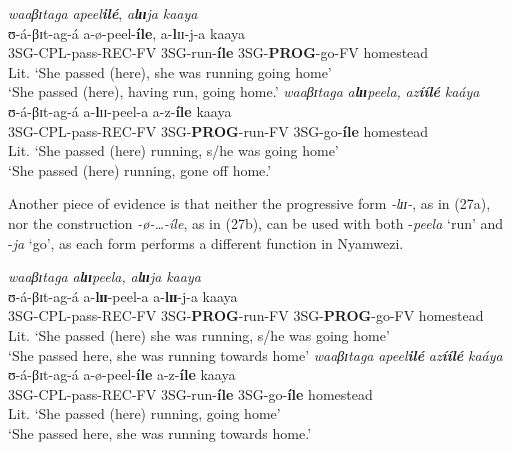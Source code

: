 \documentclass[output=paper,newtxmath,modfonts,nonflat,draftmode]{langsci/langscibook}
\begin{document}
\ea \label{ex:kanijo:26}
\ea
\glll \textit{waaβɪ}\textit{taga} \textit{apeel}\textbf{\textit{ilé}}, \textit{a}\textbf{\textit{l}}\textbf{\textit{ɪɪ}}\textit{ja} \textit{kaaya} \\
    ʊ-á-βɪt-ag-á                a-ø-peel-\textbf{íle}, a-\textbf{l}ɪɪ-j-a                 kaaya \\
    3SG-CPL-pass-REC-FV 3SG-run-\textbf{íle}  3SG-\textbf{PROG}-go-FV homestead \\
\glt    Lit. ‘She passed (here), she was running going home’ \\
   ‘She passed (here), having run, going home.’
\ex
\textit{waaβɪ}\textit{taga} \textit{a}\textbf{\textit{l}}\textbf{\textit{ɪɪ}}\textit{peela,} \textit{az}\textbf{\textit{íílé}}         \textit{kaáya}\\
    ʊ-á-βɪt-ag-á                 a-\textbf{l}ɪɪ-peel-a            a-z-\textbf{íle}       kaaya\\
    3SG-CPL-pass-REC-FV 3SG-\textbf{PROG}-run-FV 3SG-go-\textbf{íle} homestead\\
    \glt Lit. ‘She passed (here) running, s/he was going home’\\
    ‘She passed (here) running, gone off home.’
\z
\z

Another piece of evidence is that neither the progressive form \textit{-lɪɪ}\textit{-}, as in (27a), nor the construction \textit{-ø}\textit{-…-íle}, as in (27b), can be used with both -\textit{peela} ‘run’ and -\textit{ja} ‘go’, as each form performs a different function in Nyamwezi. 

\ea \label{ex:kanijo:27}
\ea
\glll *\textit{waaβɪ}\textit{taga} \textit{a}\textbf{\textit{l}}\textbf{\textit{ɪɪ}}\textit{peela,}  \textit{a}\textbf{\textit{l}}\textbf{\textit{ɪɪ}}\textit{ja} \textit{kaaya}\\
      ʊ-á-βɪt-ag-á                 a-\textbf{lɪɪ}-peel-a             a-\textbf{lɪɪ}-j-a kaaya \\
      3SG-CPL-pass-REC-FV 3SG-\textbf{PROG}-run-FV 3SG-\textbf{PROG}-go-FV  homestead \\
      \glt    Lit. ‘She passed (here) she was running, s/he was going home’\\
   ‘She passed here, she was running towards home’
\ex \glll *\textit{waaβɪ}\textit{taga} \textit{apeel}\textbf{\textit{ilé}}       \textit{az}\textbf{\textit{íílé}}        \textit{kaáya}\\
    ʊ-á-βɪt-ag-á                a-ø-peel-\textbf{íle} a-z-\textbf{íle}       kaaya\\
    3SG-CPL-pass-REC-FV 3SG-run-\textbf{íle} 3SG-go-\textbf{íle} homestead \\
\glt  Lit. ‘She passed (here) running, going home’\\
    ‘She passed here, she was running towards home.’
\z
\z
\end{document}
